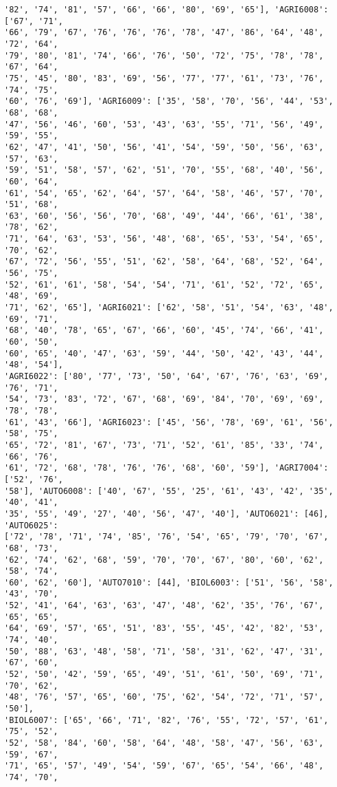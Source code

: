 \documentclass[11pt]{article}
\begin{document}
\begin{Verbatim}[commandchars=\\\{\}]
'82', '74', '81', '57', '66', '66', '80', '69', '65'], 'AGRI6008': ['67', '71',
'66', '79', '67', '76', '76', '76', '78', '47', '86', '64', '48', '72', '64',
'79', '80', '81', '74', '66', '76', '50', '72', '75', '78', '78', '67', '64',
'75', '45', '80', '83', '69', '56', '77', '77', '61', '73', '76', '74', '75',
'60', '76', '69'], 'AGRI6009': ['35', '58', '70', '56', '44', '53', '68', '68',
'47', '56', '46', '60', '53', '43', '63', '55', '71', '56', '49', '59', '55',
'62', '47', '41', '50', '56', '41', '54', '59', '50', '56', '63', '57', '63',
'59', '51', '58', '57', '62', '51', '70', '55', '68', '40', '56', '60', '64',
'61', '54', '65', '62', '64', '57', '64', '58', '46', '57', '70', '51', '68',
'63', '60', '56', '56', '70', '68', '49', '44', '66', '61', '38', '78', '62',
'71', '64', '63', '53', '56', '48', '68', '65', '53', '54', '65', '70', '62',
'67', '72', '56', '55', '51', '62', '58', '64', '68', '52', '64', '56', '75',
'52', '61', '61', '58', '54', '54', '71', '61', '52', '72', '65', '48', '69',
'71', '62', '65'], 'AGRI6021': ['62', '58', '51', '54', '63', '48', '69', '71',
'68', '40', '78', '65', '67', '66', '60', '45', '74', '66', '41', '60', '50',
'60', '65', '40', '47', '63', '59', '44', '50', '42', '43', '44', '48', '54'],
'AGRI6022': ['80', '77', '73', '50', '64', '67', '76', '63', '69', '76', '71',
'54', '73', '83', '72', '67', '68', '69', '84', '70', '69', '69', '78', '78',
'61', '43', '66'], 'AGRI6023': ['45', '56', '78', '69', '61', '56', '58', '75',
'65', '72', '81', '67', '73', '71', '52', '61', '85', '33', '74', '66', '76',
'61', '72', '68', '78', '76', '76', '68', '60', '59'], 'AGRI7004': ['52', '76',
'58'], 'AUTO6008': ['40', '67', '55', '25', '61', '43', '42', '35', '40', '41',
'35', '55', '49', '27', '40', '56', '47', '40'], 'AUTO6021': [46], 'AUTO6025':
['72', '78', '71', '74', '85', '76', '54', '65', '79', '70', '67', '68', '73',
'62', '74', '62', '68', '59', '70', '70', '67', '80', '60', '62', '58', '74',
'60', '62', '60'], 'AUTO7010': [44], 'BIOL6003': ['51', '56', '58', '43', '70',
'52', '41', '64', '63', '63', '47', '48', '62', '35', '76', '67', '65', '65',
'64', '69', '57', '65', '51', '83', '55', '45', '42', '82', '53', '74', '40',
'50', '88', '63', '48', '58', '71', '58', '31', '62', '47', '31', '67', '60',
'52', '50', '42', '59', '65', '49', '51', '61', '50', '69', '71', '70', '62',
'48', '76', '57', '65', '60', '75', '62', '54', '72', '71', '57', '50'],
'BIOL6007': ['65', '66', '71', '82', '76', '55', '72', '57', '61', '75', '52',
'52', '58', '84', '60', '58', '64', '48', '58', '47', '56', '63', '59', '67',
'71', '65', '57', '49', '54', '59', '67', '65', '54', '66', '48', '74', '70',

\end{Verbatim}
\end{document}
